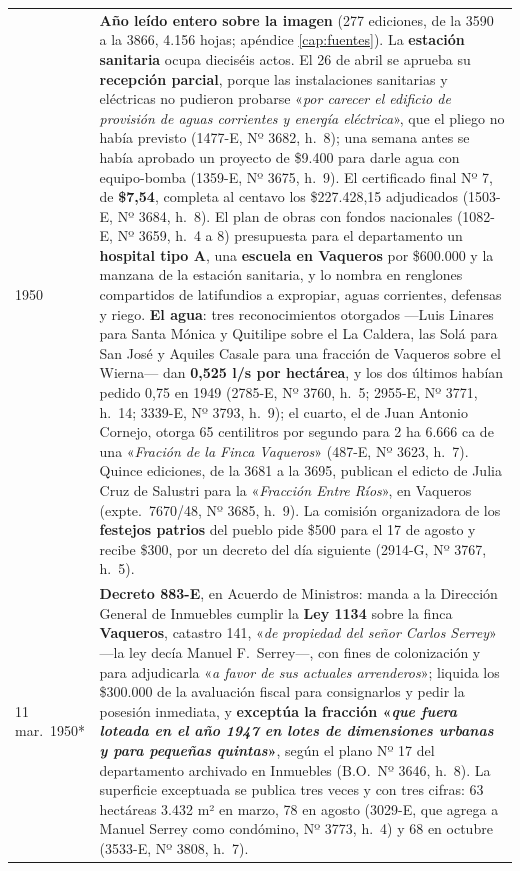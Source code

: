 \begin{longtable}{@{}p{2.7cm}p{10.3cm}@{}}
1950 & \textbf{Año leído entero sobre la imagen} (277 ediciones, de la 3590 a la 3866, 4.156 hojas; apéndice \ref{cap:fuentes}). La \textbf{estación sanitaria} ocupa dieciséis actos. El 26 de abril se aprueba su \textbf{recepción parcial}, porque las instalaciones sanitarias y eléctricas no pudieron probarse «\textit{por carecer el edificio de provisión de aguas corrientes y energía eléctrica}», que el pliego no había previsto (1477-E, Nº 3682, h.\ 8); una semana antes se había aprobado un proyecto de \$9.400 para darle agua con equipo-bomba (1359-E, Nº 3675, h.\ 9). El certificado final Nº 7, de \textbf{\$7,54}, completa al centavo los \$227.428,15 adjudicados (1503-E, Nº 3684, h.\ 8). El plan de obras con fondos nacionales (1082-E, Nº 3659, h.\ 4 a 8) presupuesta para el departamento un \textbf{hospital tipo A}, una \textbf{escuela en Vaqueros} por \$600.000 y la manzana de la estación sanitaria, y lo nombra en renglones compartidos de latifundios a expropiar, aguas corrientes, defensas y riego. \textbf{El agua}: tres reconocimientos otorgados ---Luis Linares para Santa Mónica y Quitilipe sobre el La Caldera, las Solá para San José y Aquiles Casale para una fracción de Vaqueros sobre el Wierna--- dan \textbf{0,525 l/s por hectárea}, y los dos últimos habían pedido 0,75 en 1949 (2785-E, Nº 3760, h.\ 5; 2955-E, Nº 3771, h.\ 14; 3339-E, Nº 3793, h.\ 9); el cuarto, el de Juan Antonio Cornejo, otorga 65 centilitros por segundo para 2 ha 6.666 ca de una «\textit{Fración de la Finca Vaqueros}» (487-E, Nº 3623, h.\ 7). Quince ediciones, de la 3681 a la 3695, publican el edicto de Julia Cruz de Salustri para la «\textit{Fracción Entre Ríos}», en Vaqueros (expte.\ 7670/48, Nº 3685, h.\ 9). La comisión organizadora de los \textbf{festejos patrios} del pueblo pide \$500 para el 17 de agosto y recibe \$300, por un decreto del día siguiente (2914-G, Nº 3767, h.\ 5). \\
11 mar.\ 1950* & \textbf{Decreto 883-E}, en Acuerdo de Ministros: manda a la Dirección General de Inmuebles cumplir la \textbf{Ley 1134} sobre la finca \textbf{Vaqueros}, catastro 141, «\textit{de propiedad del señor Carlos Serrey}» ---la ley decía Manuel F.\ Serrey---, con fines de colonización y para adjudicarla «\textit{a favor de sus actuales arrenderos}»; liquida los \$300.000 de la avaluación fiscal para consignarlos y pedir la posesión inmediata, y \textbf{exceptúa la fracción «\textit{que fuera loteada en el año 1947 en lotes de dimensiones urbanas y para pequeñas quintas}»}, según el plano Nº 17 del departamento archivado en Inmuebles (B.O.\ Nº 3646, h.\ 8). La superficie exceptuada se publica tres veces y con tres cifras: 63 hectáreas 3.432 m² en marzo, 78 en agosto (3029-E, que agrega a Manuel Serrey como condómino, Nº 3773, h.\ 4) y 68 en octubre (3533-E, Nº 3808, h.\ 7). \\

\end{longtable}
